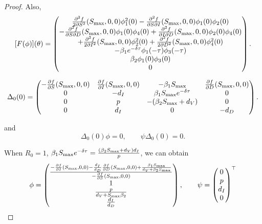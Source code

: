 \documentclass{CMHPhD-SIVD}
\begin{document}
\begin{proof}
Also,
\begin{align}\label{27}
     [F(\phi)](\theta)=
     \begin{pmatrix}
     \frac{\partial^2 f}{2\partial S^2} (S_{\text{max}}, 0, 0)\phi_1^2(0)-\frac{\partial^2 f}{\partial S\partial I} (S_{\text{max}}, 0, 0)\phi_1(0)\phi_2(0)\\-\frac{\partial^2 f}{\partial S\partial D} (S_{\text{max}}, 0, 0)\phi_1(0)\phi_4(0)+\frac{\partial^2 f }{\partial I\partial D}(S_{\text{max}}, 0, 0)\phi_2(0)\phi_4(0)\\+\frac{\partial^2 f }{2\partial I^2}(S_{\text{max}}, 0, 0)\phi_2^2(0)+\frac{\partial^2 f }{2\partial D^2}(S_{\text{max}}, 0, 0)\phi_4^2(0)\\
     -\beta_1 e^{-\delta \tau} \phi_1(-\tau) \phi_3(-\tau)  \\
     \beta_2 \phi_1(0) \phi_3(0)  \\
     0
     \end{pmatrix}.
\end{align}

\begin{small}
\begin{equation}\label{28}
     \Delta_0(0)=
     \begin{pmatrix}
       -\frac{\partial f }{\partial S}(S_{\text{max}}, 0, 0) & \frac{\partial f }{\partial I}(S_{\text{max}}, 0, 0) & -\beta_1 S_{\text{max}} & \frac{\partial f }{\partial D}(S_{\text{max}}, 0, 0) \\
       0 & -d_I & \beta_1 S_{\text{max}} e^{-\delta \tau} & 0 \\
       0 & p & -(\beta_2 S_{\text{max}}+d_V) & 0 \\
       0 & d_I & 0 & -d_D
     \end{pmatrix} .
\end{equation}
\end{small}

and
\begin{equation}\label{29}
     \Delta_0(0)\phi=0,\,\,\,\,\,\,\,\,\,\,\,\, \psi\Delta_0(0)=0.
\end{equation}

When $R_0=1$, $\beta_1 S_{\text{max}} e^{-\delta \tau}=\frac{(\beta_2 S_{\text{max}}+d_V)d_I}{p}$, we can obtain
\begin{equation}
\phi=\begin{pmatrix}
\frac{-\frac{\partial f }{\partial I}(S_{\text{max}}, 0, 0)-\frac{d_I}{d_D}\frac{\partial f}{\partial D} (S_{\text{max}}, 0, 0)+\frac{\beta_1 S_{\text{max}}}{d_V+\beta_2 S_{\text{max}}}}{-\frac{\partial f}{\partial S}(S_{\text{max}}, 0, 0)} \\
1 \\
\frac{p}{d_V+S_{\text{max}}\beta_2}\\
\frac{d_I}{d_D}
\end{pmatrix},\,\,\,\,\,\,\,\,\,\,\,\,
\psi=\begin{pmatrix}
0 \\
p \\
d_I\\
0
\end{pmatrix} ^\top
\end{equation}



\end{proof}
\end{document}
